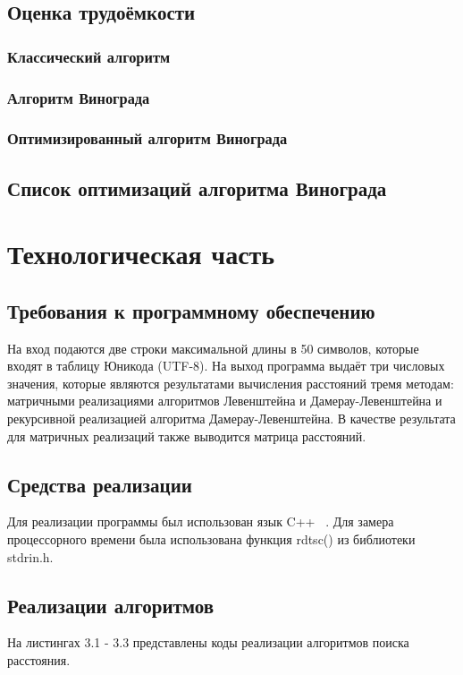 \documentclass[12pt, a4paper]{report}
\begin{document}
	\section{Оценка трудоёмкости}
	\subsection{Классический алгоритм}
	\subsection{Алгоритм Винограда}
	\subsection{Оптимизированный алгоритм Винограда}
	
	\section{Список оптимизаций алгоритма Винограда}

	\newpage
	
	\chapter{Технологическая часть}
	\section{Требования к программному обеспечению}
	На вход подаются две строки максимальной длины в 50 символов, которые входят в таблицу Юникода (UTF-8). На выход программа выдаёт три числовых значения, которые являются результатами вычисления расстояний тремя методам: матричными реализациями алгоритмов Левенштейна и Дамерау-Левенштейна и рекурсивной реализацией алгоритма Дамерау-Левенштейна. В качестве результата для матричных реализаций также выводится матрица расстояний.
	\section{Средства реализации}
	Для реализации программы был использован язык C++ ~\cite{CPP}. Для замера процессорного времени была использована функция rdtsc() из библиотеки stdrin.h.
	\section{Реализации алгоритмов}
	На листингах 3.1 - 3.3 представлены коды реализации алгоритмов поиска расстояния.
	\begin{lstlisting}[label=some-code,caption=Классический алгоритм]
	
	\end{lstlisting}
\end{document}
